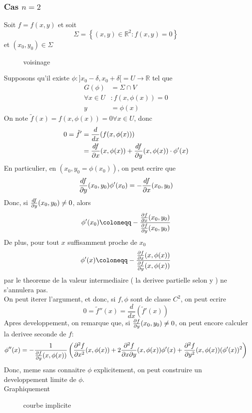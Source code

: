 \documentclass[../main.tex]{subfiles}
\begin{document}
\subsubsection{Cas $n=2$}
Soit $f= f( x,y) $ et soit
\[ 
	\Sigma = \left\{ ( x,y) \in \mathbb{R}^{2}: f( x,y) = 0 \right\} 
\]
et $( x_0,y_0) \in \Sigma$ 
\begin{figure}[H]
    \centering
    \caption{voisinage}
    \label{fig:voisinage}
\end{figure}
Supposons qu'il existe $\phi: ]x_0-\delta, x_0+ \delta[ = U \to \mathbb{R}$ tel que
\begin{align*}
	G( \phi) &= \Sigma \cap V\\
	\forall x \in U&: f( x,\phi( x) ) =0\\
	y&= \phi( x) 
\end{align*}
On note $\tilde f ( x) = f( x,\phi( x) ) = 0\forall x \in U$, donc
\begin{align*}
	0 = \tilde f ' &= \frac{d}{dx} ( f( x,\phi( x) ) ) \\
		       &= \frac{d f}{\partial x} ( x,\phi( x) ) + \frac{d f}{\partial y}( x,\phi( x) ) \cdot \phi'( x) 
\end{align*}
En particulier, en $( x_0,y_0= \phi( x_0) ) $, on peut ecrire que
\[ 
	\frac{d f}{\partial y} ( x_0,y_0)  \phi'( x_0)  = - \frac{d f}{\partial x}( x_0,y_0) 
\]
Donc, si $ \frac{d f}{\partial y}( x_0,y_0) \neq 0$, alors
\[ 
	\phi'( x_0) \coloneqq - \frac{ \frac{\del f}{\del x} ( x_0,y_0) }{\frac{\del f}{\del y}( x_0,y_0) }
\]
De plus, pour tout $x$ suffisamment proche de $x_0$ 
\[ 
	\phi'( x) \coloneqq - \frac{ \frac{\del f}{\del x} ( x,\phi( x) ) }{\frac{\del f}{\del y}(x, \phi( x) ) }
\]
par le theoreme de la valeur intermediaire ( la derivee partielle selon y ) ne s'annulera pas.\\
On peut iterer l'argument, et donc, si $f,\phi$ sont de classe $C^{2}$, on peut ecrire
\[ 
	0 = \tilde f ''( x) = \frac{d}{dx}( \tilde f'( x) ) 
\]
Apres developpement, on remarque que, si $ \frac{\partial f}{\partial y} ( x_0,y_0) \neq 0$, on peut encore calculer la derivee seconde de $f$:
\[ 
	\phi''( x) = - \frac{1}{ \frac{\partial f}{\partial y}( x,\phi( x) ) } \left( \frac{\partial ^{2}f}{\partial x^{2}}( x,\phi( x) ) + 2 \frac{\partial ^{2}f}{ \partial x \partial y} ( x,\phi( x) ) \phi'( x) + \frac{\partial^{2} f}{\partial y^{2}} ( x,\phi( x) ) ( \phi'( x) )^{2} \right) 
\]
Donc, meme sans connaitre $\phi$ explicitement, on peut construire un developpement limite de $\phi$.\\
Graphiquement
\begin{figure}[H]
    \centering
    \caption{courbe implicite}
    \label{fig:courbe-implicite}
\end{figure}
\end{document}
